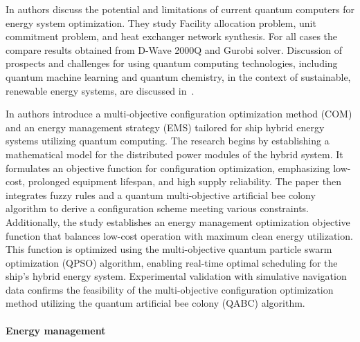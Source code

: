 \documentclass[a4paper,11pt]{article}
\begin{document}
In \cite{ajagekar2019quantum} authors discuss the potential and limitations of current quantum computers for energy system optimization. They study 
Facility allocation problem, unit commitment problem, and heat exchanger network synthesis. For all cases the compare results obtained from D-Wave 2000Q and Gurobi solver.
Discussion of prospects and challenges for using quantum computing technologies, including quantum machine learning and quantum chemistry, in the context of sustainable, renewable energy systems, are discussed in~\cite{ajagekar2022quantum}.


In \cite{si2022configuration} authors introduce a multi-objective configuration optimization method (COM) and an energy management strategy (EMS) tailored for ship hybrid energy systems utilizing quantum computing. The research begins by establishing a mathematical model for the distributed power modules of the hybrid system. It formulates an objective function for configuration optimization, emphasizing low-cost, prolonged equipment lifespan, and high supply reliability. The paper then integrates fuzzy rules and a quantum multi-objective artificial bee colony algorithm to derive a configuration scheme meeting various constraints. Additionally, the study establishes an energy management optimization objective function that balances low-cost operation with maximum clean energy utilization. This function is optimized using the multi-objective quantum particle swarm optimization (QPSO) algorithm, enabling real-time optimal scheduling for the ship's hybrid energy system. Experimental validation with simulative navigation data confirms the feasibility of the multi-objective configuration optimization method utilizing the quantum artificial bee colony (QABC) algorithm.






\paragraph{Energy management}
\end{document}
